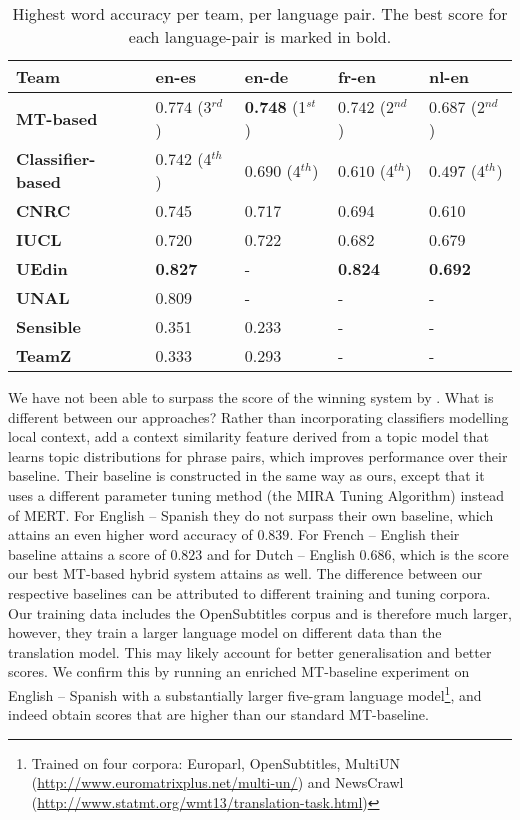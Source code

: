 \begin{table}[htb]
\begin{center}
\caption{Highest word accuracy per team, per language pair. The best score for each language-pair is marked in bold.}
\label{tab:comparison}
\begin{tabular}{|l|llll|}
\hline
Team & \textbf{en-es} & \textbf{en-de} & \textbf{fr-en} & \textbf{nl-en} \\ 
\hline
\textbf{MT-based} & $0.774$ (3$^{rd}$) & \textbf{0.748} (1$^{st}$) & $0.742$ (2$^{nd}$) & $0.687$ (2$^{nd}$) \\
\textbf{Classifier-based} & $0.742$ (4$^{th}$) & $0.690$ (4$^{th}$) & $0.610$ (4$^{th}$) & $0.497$ (4$^{th}$) \\ 
\hline
\textbf{CNRC} \citep{CNRC} & 0.745 & 0.717 & 0.694 & 0.610 \\
\textbf{IUCL} \citep{IUCL}  & 0.720 & 0.722 & 0.682 & 0.679 \\
\textbf{UEdin} \citep{UEDIN}  & \textbf{0.827} &  - & \textbf{0.824} & \textbf{0.692} \\
\textbf{UNAL} \citep{UNAL} & 0.809 & - & - & -  \\
\textbf{Sensible} \citep{SENSIBLE} & 0.351 & 0.233 & - & - \\
\textbf{TeamZ} \citep{TEAMZ} & 0.333 &  0.293 & - & -  \\
\hline
\end{tabular}
\end{center}
\end{table}

We have not been able to surpass the score of the winning system by
\cite{UEDIN}. What is different between our approaches? Rather than
incorporating classifiers modelling local context, \cite{UEDIN} add a context
similarity feature derived from a topic model that learns topic distributions
for phrase pairs, which improves performance over their baseline. Their
baseline is constructed in the same way as ours, except that it uses a
different parameter tuning method (the MIRA Tuning Algorithm) instead of MERT.
For English -- Spanish they do not surpass their own baseline, which attains an
even higher word accuracy of $0.839$. For French -- English their baseline
attains a score of $0.823$ and for Dutch -- English $0.686$, which is the score
our best MT-based hybrid system attains as well. The difference between our respective
baselines can be attributed to different training and tuning corpora.  Our
training data includes the OpenSubtitles corpus and is therefore much
larger, however, they train a larger language model on different data than the
translation model. This may likely account for better generalisation and better
scores. We confirm this by running an enriched MT-baseline experiment on
English -- Spanish with a substantially larger five-gram language
model\footnote{Trained on four corpora: Europarl, OpenSubtitles, MultiUN
(\url{http://www.euromatrixplus.net/multi-un/}) and NewsCrawl
(\url{http://www.statmt.org/wmt13/translation-task.html})}, and indeed
obtain scores that are higher than our standard MT-baseline.

